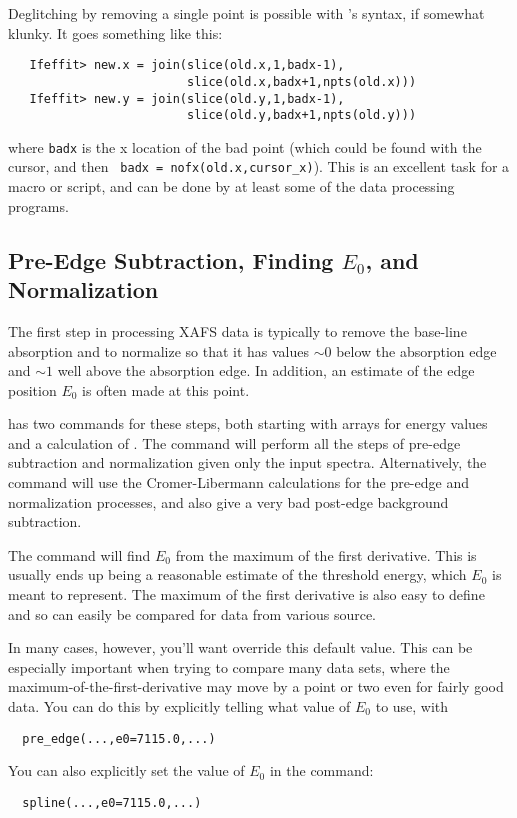 Deglitching by removing a single point is possible with {\ifeffit}'s
syntax, if somewhat klunky.  It goes something like this:
\begin{verbatim}
   Ifeffit> new.x = join(slice(old.x,1,badx-1),
                         slice(old.x,badx+1,npts(old.x)))
   Ifeffit> new.y = join(slice(old.y,1,badx-1),
                         slice(old.y,badx+1,npts(old.y)))
\end{verbatim}
\noindent
where {\tt{badx}} is the x location of the bad point (which could be found
with the cursor, and then {\tt{ badx = nofx(old.x,cursor\_x)}}).  This is an
excellent task for a macro or script, and can be done by at least some of
the data processing programs.

\subsection{Pre-Edge Subtraction, Finding $E_0$, and Normalization}
\label{Ch:XAFSProcess-preedge} 

The first step in processing XAFS data is typically to remove the base-line
absorption and to normalize {\muE} so that it has values $\sim 0$ below the
absorption edge and $\sim 1$ well above the absorption edge.  In addition,
an estimate of the edge position $E_0$ is often made at this point.

{\ifeffit} has two commands for these steps, both starting with arrays for
energy values and a calculation of {\muE}. The {} command
will perform all the steps of pre-edge subtraction and normalization given
only the input spectra.  Alternatively, the {} command will
use the Cromer-Libermann calculations for the pre-edge and normalization
processes, and also give a very bad post-edge background subtraction.


The {} command will find $E_0$ from the maximum of the
first derivative.  This is usually ends up being a reasonable estimate of
the threshold energy, which $E_0$ is meant to represent.  The maximum of
the first derivative is also easy to define and so can easily be compared
for data from various source.

In many cases, however, you'll want override this default value. This can
be especially important when trying to compare many data sets, where the
maximum-of-the-first-derivative may move by a point or two even for fairly
good data. You can do this by explicitly telling  {}
what value of $E_0$ to use, with
\begin{verbatim}
  pre_edge(...,e0=7115.0,...)
\end{verbatim}
\noindent
You can also explicitly set the value of $E_0$ in the {}
command:
\begin{verbatim}
  spline(...,e0=7115.0,...)
\end{verbatim}
\noindent

